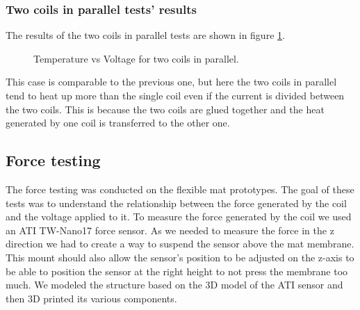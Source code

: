 \subsubsection{Two coils in parallel tests' results}
The results of the two coils in parallel tests are shown in figure \ref{fig: Two_coils_heating_tests}.
\begin{figure}
    \centering
    \caption{Temperature vs Voltage for two coils in parallel.}
    \label{fig: Two_coils_heating_tests}
\end{figure}
This case is comparable to the previous one, but here the two coils in parallel tend to heat up more than the single coil even if the current is divided between the two coils.
This is because the two coils are glued together and the heat generated by one coil is transferred to the other one.

\subsection{Force testing}
The force testing was conducted on the flexible mat prototypes.
The goal of these tests was to understand the relationship between the force generated by the coil and the voltage applied to it.
To measure the force generated by the coil we used an ATI TW-Nano17 force sensor.
As we needed to measure the force in the z direction we had to create a way to suspend the sensor above the mat membrane.
This mount should also allow the sensor's position to be adjusted on the z-axis to be able to position the sensor at the right height to not press the membrane too much.
We modeled the structure based on the 3D model of the ATI sensor and then 3D printed its various components.

